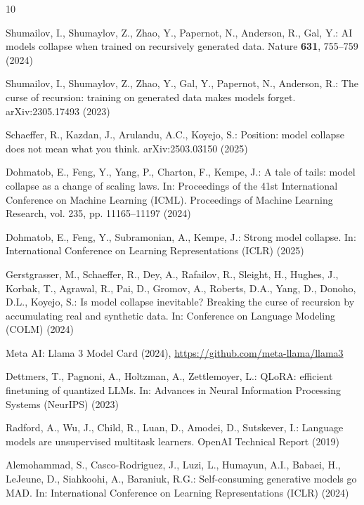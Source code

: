 \documentclass{svproc}
\begin{document}
%     
%     
\begin{thebibliography}{10}

Shumailov, I., Shumaylov, Z., Zhao, Y., Papernot, N., Anderson, R., Gal, Y.:
AI models collapse when trained on recursively generated data. Nature \textbf{631},
755--759 (2024)

Shumailov, I., Shumaylov, Z., Zhao, Y., Gal, Y., Papernot, N., Anderson, R.:
The curse of recursion: training on generated data makes models forget.
arXiv:2305.17493 (2023)

Schaeffer, R., Kazdan, J., Arulandu, A.C., Koyejo, S.: Position: model collapse
does not mean what you think. arXiv:2503.03150 (2025)

Dohmatob, E., Feng, Y., Yang, P., Charton, F., Kempe, J.: A tale of tails: model
collapse as a change of scaling laws. In: Proceedings of the 41st International
Conference on Machine Learning (ICML). Proceedings of Machine Learning Research,
vol. 235, pp. 11165--11197 (2024)

Dohmatob, E., Feng, Y., Subramonian, A., Kempe, J.: Strong model collapse. In:
International Conference on Learning Representations (ICLR) (2025)

Gerstgrasser, M., Schaeffer, R., Dey, A., Rafailov, R., Sleight, H., Hughes, J.,
Korbak, T., Agrawal, R., Pai, D., Gromov, A., Roberts, D.A., Yang, D., Donoho, D.L.,
Koyejo, S.: Is model collapse inevitable? Breaking the curse of recursion by
accumulating real and synthetic data. In: Conference on Language Modeling (COLM)
(2024)

Meta AI: Llama 3 Model Card (2024), \url{https://github.com/meta-llama/llama3}

Dettmers, T., Pagnoni, A., Holtzman, A., Zettlemoyer, L.: QLoRA: efficient
finetuning of quantized LLMs. In: Advances in Neural Information Processing Systems
(NeurIPS) (2023)

Radford, A., Wu, J., Child, R., Luan, D., Amodei, D., Sutskever, I.: Language models
are unsupervised multitask learners. OpenAI Technical Report (2019)

Alemohammad, S., Casco-Rodriguez, J., Luzi, L., Humayun, A.I., Babaei, H.,
LeJeune, D., Siahkoohi, A., Baraniuk, R.G.: Self-consuming generative models go MAD.
In: International Conference on Learning Representations (ICLR) (2024)

\end{thebibliography}
\end{document}
